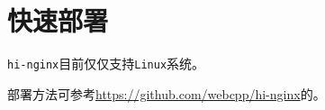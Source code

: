\section{快速部署}
\texttt{hi-nginx}目前仅仅支持\texttt{Linux}系统。

部署方法可参考\url{https://github.com/webcpp/hi-nginx}的。

